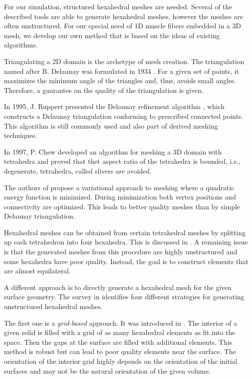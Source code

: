 For our simulation, structured hexahedral meshes are needed. Several of the described tools are able to generate hexahedral meshes, however the meshes are often unstructured. For our special need of 1D muscle fibers embedded in a 3D mesh, we develop our own method that is based on the ideas of existing algorithms.

Triangulating a 2D domain is the archetype of mesh creation. The triangulation named after B. Delaunay was formulated in 1934 \cite{delaunay1934sphere}. For a given set of points, it maximizes the minimum angle of the triangles and, thus, avoids small angles. Therefore, a guarantee on the quality of the triangulation is given.

In 1995, J. Ruppert presented the Delaunay refinement algorithm \cite{Ruppert1995}, which constructs a Delaunay triangulation conforming to prescribed connected points. This algorithm is still commonly used and also part of derived meshing techniques.

In 1997, P. Chew developed an algorithm for meshing a 3D domain with tetrahedra \cite{chew1997guaranteed} and proved that thet aspect ratio of the tetrahedra is bounded, i.e., degenerate,  tetrahedra, called slivers are avoided.

The authors of \cite{Alliez2005Variational} propose a variational approach to meshing where a quadratic energy function is minimized. During minimization both vertex positions and connectivity are optimized. This leads to better quality meshes than by simple Delaunay triangulation.

Hexahedral meshes can be obtained from certain tetrahedral meshes by splitting up each tetrahedron into four hexahedra. This is discussed in \cite{eppstein1999linear}. A remaining issue is that the generated meshes from this procedure are highly unstructured and some hexahedra have poor quality. Instead, the goal is to construct elements that are almost equilateral.

A different approach is to directly generate a hexahedral mesh for the given surface geometry.
The survey in \cite{owen1998survey} identifies four different strategies for generating unstructured hexahedral meshes.

The first one is a \emph{grid-based} approach. It was introduced in \cite{schneiders1996grid,schneiders1997algorithm}. The interior of a given solid is filled with a grid of as many hexahedral elements as fit into the space. Then the gaps at the surface are filled with additional elements. This method is robust but can lead to poor quality elements near the surface. The orientation of the interior grid highly depends on the orientation of the initial surfaces and may not be the natural orientation of the given volume.

